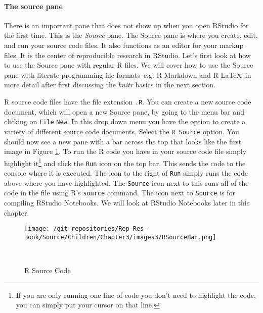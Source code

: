{\paragraph{The source pane}

There is an important pane that does not show up when you open RStudio for the first time. This is the {\emph{Source}} pane. The Source pane is where you create, edit, and run your source code files. It also functions as an editor for your markup files. It is the center of reproducible research in RStudio. Let's first look at how to use the Source pane with regular R files. We will cover how to use the Source pane with literate programming file formats--e.g. R Markdown and R LaTeX--in more detail after first discussing the {\emph{knitr}} basics in the next section. 

R source code files have the file extension \texttt{.R}. You can create a new source code document, which will open a new Source pane, by going to the menu bar and clicking on \texttt{File} \textrightarrow \: \texttt{New}. In this drop down menu you have the option to create a variety of different source code documents. Select the \texttt{R Source} option. You should now see a new pane with a bar across the top that looks like the first image in Figure \ref{SourcePanes}. To run the R code you have in your source code file simply highlight it\footnote{If you are only running one line of code you don't need to highlight the code, you can simply put your cursor on that line.} and click the \texttt{Run} icon on the top bar. This sends the code to the console where it is executed. The icon to the right of \texttt{Run} simply runs the code above where you have highlighted. The \texttt{Source} icon next to this runs all of the code in the file using R's \texttt{source} command. The icon next to \texttt{Source} is for compiling RStudio Notebooks. We will look at RStudio Notebooks later in this chapter.

\begin{figure}[ht]
    \caption{RStudio Source Code Pane Top Bars}
    \label{SourcePanes}
    \begin{center}
    
        \begin{subfigure}
            \caption{R Source Code}
            \texttt{[image: /git\_repositories/Rep-Res-Book/Source/Children/Chapter3/images3/RSourceBar.png]}
        \end{subfigure}\\[0.5cm]
        

\end{center}
\end{figure}}
